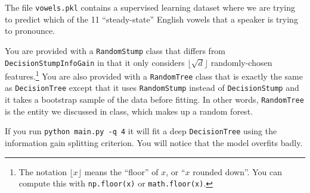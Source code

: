 \documentclass{article}
\begin{document}
    The file \texttt{vowels.pkl} contains a supervised learning dataset where we are trying to predict which of the 11 ``steady-state'' English vowels that a speaker is trying to pronounce.

    You are provided with a \texttt{RandomStump} class that differs from
    \texttt{DecisionStumpInfoGain} in that
    it only considers $\lfloor \sqrt{d} \rfloor$ randomly-chosen features.\footnote{The notation $\lfloor x\rfloor$ means the ``floor'' of $x$, or ``$x$ rounded down''. You can compute this with \texttt{np.floor(x)} or \texttt{math.floor(x)}.}
    You are also provided with a \texttt{RandomTree} class that is exactly the same as
    \texttt{DecisionTree} except that it uses \texttt{RandomStump} instead of
    \texttt{DecisionStump} and it takes a bootstrap sample of the data before fitting.
    In other words, \texttt{RandomTree} is the entity we discussed in class, which
    makes up a random forest.

    If you run \texttt{python main.py -q 4} it will fit a deep \texttt{DecisionTree}
    using the information gain splitting criterion. You will notice that the model overfits badly.
\end{document}
